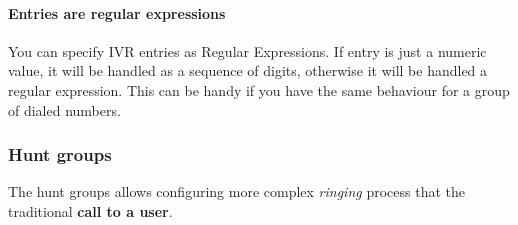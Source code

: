 \documentclass[letterpaper,10pt,english]{sphinxmanual}
\begin{document}
\paragraph{Entries are regular expressions}

You can specify IVR entries as Regular Expressions. If entry is just
a numeric value, it will be handled as a sequence of digits, otherwise it
will be handled a regular expression. This can be handy if you have the
same behaviour for a group of dialed numbers.


\subsubsection{Hunt groups}
\label{administration_portal/client/vpbx/routing_endpoints/hunt_groups:hunt-groups}\label{administration_portal/client/vpbx/routing_endpoints/hunt_groups::doc}\label{administration_portal/client/vpbx/routing_endpoints/hunt_groups:huntgroups}
The hunt groups allows configuring more complex \emph{ringing} process that the
traditional \textbf{call to a user}.
\end{document}
